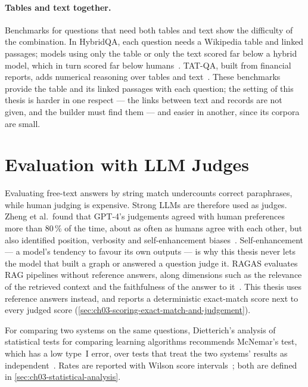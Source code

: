 \paragraph{Tables and text together.} Benchmarks for questions that need both tables and text show the
difficulty of the combination. In HybridQA, each question needs a Wikipedia table and linked passages; models
using only the table or only the text scored far below a hybrid model, which in turn scored far below
humans~\cite{chen2020hybridqa}. TAT-QA, built from financial reports, adds numerical reasoning over tables and
text~\cite{zhu2021tatqa}. These benchmarks provide the table and its linked passages with each question; the
setting of this thesis is harder in one respect --- the links between text and records are not given, and the
builder must find them --- and easier in another, since its corpora are small.

\section{Evaluation with LLM Judges}\label{sec:ch02-evaluation-with-llm-judges}

Evaluating free-text answers by string match undercounts correct paraphrases, while human judging is
expensive. Strong LLMs are therefore used as judges. Zheng et al.\ found that GPT-4's judgements agreed with
human preferences more than 80\,\% of the time, about as often as humans agree with each other, but also
identified position, verbosity and self-enhancement biases~\cite{zheng2023judging}. Self-enhancement --- a
model's tendency to favour its own outputs --- is why this thesis never lets the model that built a graph or
answered a question judge it. RAGAS evaluates RAG pipelines without reference answers, along dimensions such as
the relevance of the retrieved context and the faithfulness of the answer to it~\cite{es2024ragas}. This thesis
uses reference answers instead, and reports a deterministic exact-match score next to every judged score
(\cref{sec:ch03-scoring-exact-match-and-judgement}).

For comparing two systems on the same questions, Dietterich's analysis of statistical tests for comparing
learning algorithms recommends McNemar's test, which has a low type~I error, over tests that treat the two
systems' results as independent~\cite{dietterich1998approximate,mcnemar1947note}. Rates are reported with
Wilson score intervals~\cite{wilson1927probable}; both are defined in \cref{sec:ch03-statistical-analysis}.

